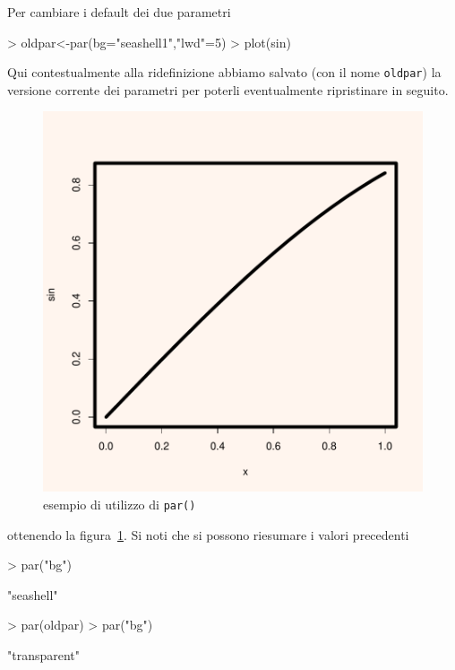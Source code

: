 \documentclass[onecolumn,11pt]{book}
\begin{document}
Per cambiare i default dei due parametri
\begin{Schunk}
\begin{Sinput}
> oldpar<-par(bg="seashell1","lwd"=5)
> plot(sin)
\end{Sinput}
\end{Schunk}
Qui contestualmente alla ridefinizione abbiamo salvato (con il nome \texttt{oldpar}) la versione corrente dei parametri per poterli eventualmente ripristinare in seguito.
\begin{figure}\begin{center}
\includegraphics{statisticaconR-334}
\caption{esempio di utilizzo di \texttt{par()}
}
\label{parbg}
\end{center}
\end{figure}
ottenendo la figura~\ref{parbg}.
Si noti che si possono riesumare i valori precedenti 
\begin{Schunk}
\begin{Sinput}
> par("bg")
\end{Sinput}
\begin{Soutput}
[1] "seashell"
\end{Soutput}
\begin{Sinput}
> par(oldpar)
> par("bg")
\end{Sinput}
\begin{Soutput}
[1] "transparent"
\end{Soutput}
\end{Schunk}
\end{document}
